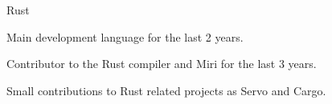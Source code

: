 


\begin{cvskills}


\cvskill
{Rust} %
{
    \begin{cvitems}
    \item Main development language for the last 2 years.
    \item Contributor to the Rust compiler and Miri for the last 3 years.
    \item Small contributions to Rust related projects as Servo and Cargo.
    \end{cvitems}
}



\end{cvskills}
